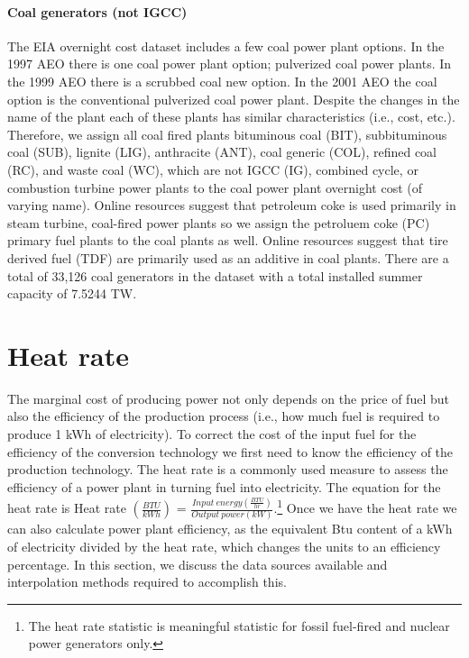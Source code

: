 \documentclass[10pt]{report}
\begin{document}
\subsubsection{Coal generators (not IGCC)}
The EIA overnight cost dataset includes a few coal power plant options. 
In the 1997 AEO there is one coal power plant option; pulverized coal power plants.
In the 1999 AEO there is a scrubbed coal new option. 
In the 2001 AEO the coal option is the conventional pulverized coal power plant.
Despite the changes in the name of the plant each of these plants has similar characteristics (i.e., cost, etc.).
Therefore, we assign all coal fired plants bituminous coal (BIT), subbituminous coal (SUB), lignite (LIG), anthracite (ANT), coal generic (COL), refined coal (RC), and waste coal (WC), which are not IGCC (IG), combined cycle, or combustion turbine power plants to the coal power plant overnight cost (of varying name).
Online resources suggest that petroleum coke is used primarily in steam turbine, coal-fired power plants so we assign the petroluem coke (PC) primary fuel plants to the coal plants as well.  
Online resources suggest that tire derived fuel (TDF) are primarily used as an additive in coal plants. 
There are a total of 33,126 coal generators in the dataset with a total installed summer capacity of 7.5244 TW. 

\chapter{Heat rate}
The marginal cost of producing power not only depends on the price of fuel but also the efficiency of the production process (i.e., how much fuel is required to produce 1 kWh of electricity). 
To correct the cost of the input fuel for the efficiency of the conversion technology we first need to know the efficiency of the production technology.
The heat rate is a commonly used measure to assess the efficiency of a power plant in turning fuel into electricity. 
The equation for the heat rate is Heat rate $(\frac{BTU}{kWh})$ = $\frac{Input\ energy (\frac{BTU}{hr})}{Output\ power (kW)}$.\footnote{The heat rate statistic is meaningful statistic for fossil fuel-fired and nuclear power generators only.}  
Once we have the heat rate we can also calculate power plant efficiency, as the equivalent Btu content of a kWh of electricity divided by the heat rate, which changes the units to an efficiency percentage.
In this section, we discuss the data sources available and interpolation methods required to accomplish this. 
\end{document}
